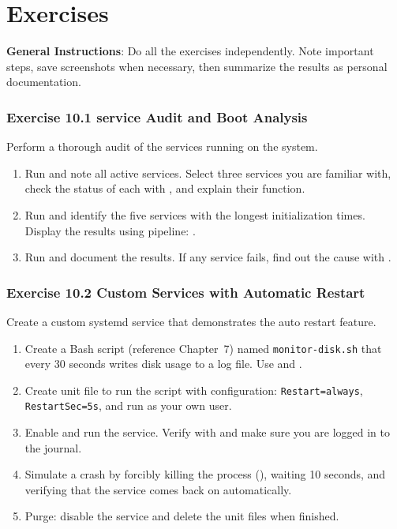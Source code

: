 \section{Exercises}
\label{sec:service-exercises}

\textbf{General Instructions}: Do all the exercises independently. Note important steps, save screenshots when necessary, then summarize the results as personal documentation.

\subsubsection*{Exercise 10.1 service Audit and Boot Analysis}
Perform a thorough audit of the services running on the system.
\begin{enumerate}
\item Run  and note all active services. Select three services you are familiar with, check the status of each with , and explain their function.
\item Run  and identify the five services with the longest initialization times. Display the results using pipeline: .
\item Run  and document the results. If any service fails, find out the cause with .
\end{enumerate}

\subsubsection*{Exercise 10.2 Custom Services with Automatic Restart}
Create a custom systemd service that demonstrates the auto restart feature.
\begin{enumerate}
\item Create a Bash script (reference Chapter~7) named \texttt{monitor-disk.sh} that every 30 seconds writes disk usage to a log file. Use  and .
\item Create unit file  to run the script with configuration: \texttt{Restart=always}, \texttt{RestartSec=5s}, and run as your own user.
\item Enable and run the service. Verify with  and make sure you are logged in to the journal.
\item Simulate a crash by forcibly killing the process (), waiting 10 seconds, and verifying that the service comes back on automatically.
\item Purge: disable the service and delete the unit files when finished.
\end{enumerate}

